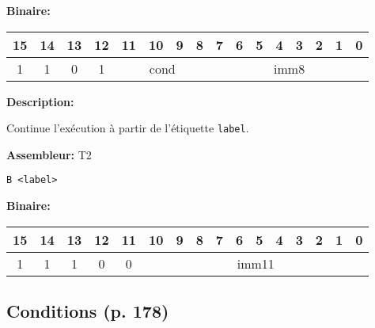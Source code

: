 \documentclass{article}
\begin{document}
    \textbf{Binaire:}

    \begin{tabular}{| c c c c c c c c c c c c c c c c |}
        \hline
        15 & 14 & 13 & 12 & \multicolumn{1}{|c}{11} & 10 & 9 & 8 & \multicolumn{1}{|c}{7} & 6 & 5 & 4 & 3 & 2 & 1 & 0 \\
        \hline
        1 & 1 & 0 & 1 & \multicolumn{4}{|c}{cond} & \multicolumn{8}{|c|}{imm8} \\
        \hline
    \end{tabular}



    \textbf{Description: }

    Continue l'exécution à partir de l'étiquette \texttt{label}.

    \textbf{Assembleur:} T2

    \begin{lstlisting}
B <label>
    \end{lstlisting}

    \textbf{Binaire:}

    \begin{tabular}{| c c c c c c c c c c c c c c c c |}
        \hline
        15 & 14 & 13 & 12 & 11 & \multicolumn{1}{|c}{10} & 9 & 8 & 7 & 6 & 5 & 4 & 3 & 2 & 1 & 0 \\
        \hline
        1 & 1 & 1 & 0 & 0 & \multicolumn{11}{|c|}{imm11} \\
        \hline
    \end{tabular}

    \subsection{Conditions (p. 178)}
    \label{subsec:CondFlags}
\end{document}

